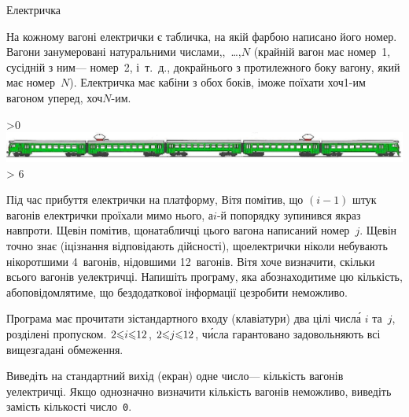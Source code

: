 \documentclass[14pt,a4paper]{extarticle}
\begin{document}
\begin{problemAllDefault}{Електричка}

На кожному вагоні електрички є табличка, на якій фарбою написано його номер. Вагони занумеровані натуральними числами,,~\dots,\nolinebreak[2] $N$ (крайній вагон має номер~1, сусідній з ним\nolinebreak[3] --- номер~2, і~т.~д., до\nolinebreak[3] крайнього з протилежного боку вагону, який має номер~$N$). Електричка має кабіни з обох боків, і\nolinebreak[3] може поїхати хоч\nolinebreak[2] \mbox{1-им} вагоном уперед, хоч\nolinebreak[3] \mbox{$N$-им}.

\ifnum\pdfoutput>0
\includegraphics[width=\textwidth,keepaspectratio=true]{elTrain.png}
\else
{}
\ifnum\number\month > 6 \ERROR {}\fi
\fi

Під час прибуття електрички на платформу, Вітя помітив, що ${(i{-}1)}$ штук вагонів електрички проїхали мимо нього, а\nolinebreak[2] \mbox{$i$-й} по\nolinebreak[2] порядку зупинився якраз навпроти. Ще\nolinebreak[2] він помітив, що\nolinebreak[2] на\nolinebreak[2] табличці цього вагона написаний номер~$j$. Ще\nolinebreak[2] він точно знає (і\nolinebreak[2] ці\nolinebreak[2] знання відповідають дійсності), що\nolinebreak[2] електрички ніколи не\nolinebreak[3] бувають ні\nolinebreak[3] коротшими 4~вагонів, ні\nolinebreak[3] довшими 12~вагонів. Вітя хоче визначити, скільки всього вагонів у\nolinebreak[2] електричці. Напишіть програму, яка або\nolinebreak[2] знаходитиме цю кількість, або\nolinebreak[2] повідомлятиме, що без\nolinebreak[1] додаткової інформації це\nolinebreak[1] зробити неможливо.

\InputFile
Програма має прочитати зі\nolinebreak[3] стандартного входу (клавіатури) два цілі числ\'{а} $i$ та~$j$, розділені пропуском. ${2{\leqslant}i{\leqslant}12}$, ${2{\leqslant}j{\leqslant}12}$, ч\'{и}сла гарантовано задовольняють всі вищезгадані обмеження.

\OutputFile
Виведіть на стандартний вихід (екран) одне число\nolinebreak[3] --- кількість вагонів у\nolinebreak[3] електричці. Якщо однозначно визначити кількість вагонів неможливо, виведіть замість кількості число~\texttt{0}.

\Example
\begin{exampleSimple}{3em}{3em}%
%
\end{exampleSimple}

\end{problemAllDefault}
	
\end{document}
